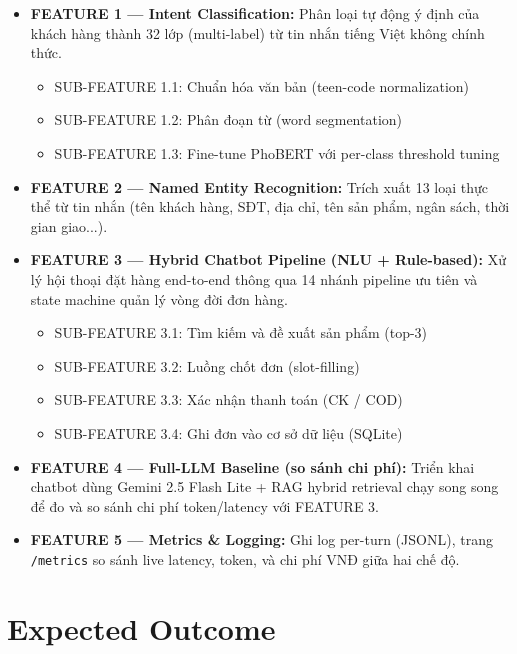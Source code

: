 \documentclass[12pt, a4paper]{report}
\begin{document}
\begin{itemize}
  \item \textbf{FEATURE 1 --- Intent Classification:}
        Phân loại tự động ý định của khách hàng thành 32 lớp (multi-label)
        từ tin nhắn tiếng Việt không chính thức.
        \begin{itemize}
          \item SUB-FEATURE 1.1: Chuẩn hóa văn bản (teen-code normalization)
          \item SUB-FEATURE 1.2: Phân đoạn từ (word segmentation)
          \item SUB-FEATURE 1.3: Fine-tune PhoBERT với per-class threshold tuning
        \end{itemize}

  \item \textbf{FEATURE 2 --- Named Entity Recognition:}
        Trích xuất 13 loại thực thể từ tin nhắn (tên khách hàng,
        SĐT, địa chỉ, tên sản phẩm, ngân sách, thời gian giao...).

  \item \textbf{FEATURE 3 --- Hybrid Chatbot Pipeline (NLU + Rule-based):}
        Xử lý hội thoại đặt hàng end-to-end thông qua 14 nhánh pipeline
        ưu tiên và state machine quản lý vòng đời đơn hàng.
        \begin{itemize}
          \item SUB-FEATURE 3.1: Tìm kiếm và đề xuất sản phẩm (top-3)
          \item SUB-FEATURE 3.2: Luồng chốt đơn (slot-filling)
          \item SUB-FEATURE 3.3: Xác nhận thanh toán (CK / COD)
          \item SUB-FEATURE 3.4: Ghi đơn vào cơ sở dữ liệu (SQLite)
        \end{itemize}

  \item \textbf{FEATURE 4 --- Full-LLM Baseline (so sánh chi phí):}
        Triển khai chatbot dùng Gemini 2.5 Flash Lite + RAG hybrid retrieval
        chạy song song để đo và so sánh chi phí token/latency với FEATURE 3.

  \item \textbf{FEATURE 5 --- Metrics \& Logging:}
        Ghi log per-turn (JSONL), trang \texttt{/metrics} so sánh live
        latency, token, và chi phí VNĐ giữa hai chế độ.
\end{itemize}

\section{Expected Outcome}
\end{document}

